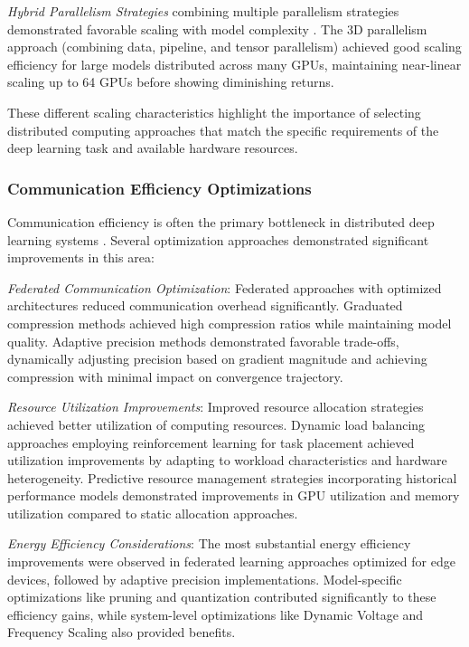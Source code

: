 \textit{Hybrid Parallelism Strategies} combining multiple parallelism strategies demonstrated favorable scaling with model complexity \citep{Narayanan2021}. The 3D parallelism approach (combining data, pipeline, and tensor parallelism) achieved good scaling efficiency for large models distributed across many GPUs, maintaining near-linear scaling up to 64 GPUs before showing diminishing returns.

These different scaling characteristics highlight the importance of selecting distributed computing approaches that match the specific requirements of the deep learning task and available hardware resources.

\subsubsection{Communication Efficiency Optimizations}
Communication efficiency is often the primary bottleneck in distributed deep learning systems \citep{Alistarh2017}. Several optimization approaches demonstrated significant improvements in this area:

\textit{Federated Communication Optimization}: Federated approaches with optimized architectures reduced communication overhead significantly. Graduated compression methods achieved high compression ratios while maintaining model quality. Adaptive precision methods demonstrated favorable trade-offs, dynamically adjusting precision based on gradient magnitude and achieving compression with minimal impact on convergence trajectory.

\textit{Resource Utilization Improvements}: Improved resource allocation strategies achieved better utilization of computing resources. Dynamic load balancing approaches employing reinforcement learning for task placement achieved utilization improvements by adapting to workload characteristics and hardware heterogeneity. Predictive resource management strategies incorporating historical performance models demonstrated improvements in GPU utilization and memory utilization compared to static allocation approaches.

\textit{Energy Efficiency Considerations}: The most substantial energy efficiency improvements were observed in federated learning approaches optimized for edge devices, followed by adaptive precision implementations. Model-specific optimizations like pruning and quantization contributed significantly to these efficiency gains, while system-level optimizations like Dynamic Voltage and Frequency Scaling also provided benefits.

